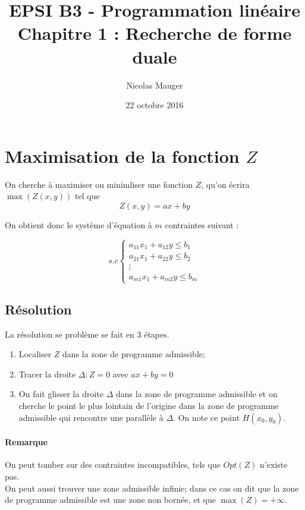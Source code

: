 



\title{EPSI B3 - Programmation linéaire\\Chapitre 1 : Recherche de forme duale}

\author{Nicolas Mauger}

\date{22 octobre 2016}

\maketitle

\section{Maximisation de la fonction $Z$}
On cherche à maximiser ou minimliser une fonction $Z$, qu'on écrira
$\max(Z(x,y))$ tel que $$Z(x,y) = ax + by$$

On obtient donc le système d'équation à $m$ contraintes suivant :

\begin{equation*}
  s.c
     \begin{cases}
        a_{11}x_{1} + a_{12}y \leq b_{1} \\
        a_{21}x_{1} + a_{22}y \leq b_{2} \\
        \vdots                           \\
        a_{m1}x_{1} + a_{m2}y \leq b_{m}
     \end{cases}
\end{equation*}

\subsection{Résolution}
La résolution se problème se fait en 3 étapes.
\begin{enumerate}
  \item Localiser $Z$ dans la zone de programme admissible;
  \item Tracer la droite $ \Delta : Z = 0 $ avec $ax+by=0$
  \item On fait glisser la droite $\Delta$ dans la zone de programme admissible
  et on cherche le point le plus lointain de l'origine dans la zone de programme
  admissible qui rencontre une parallèle à $\Delta$. On note ce point
  $H(x_{0},y_{0})$.
\end{enumerate}

\paragraph{Remarque}
On peut tomber sur des contraintes incompatibles, tels que $Opt(Z)$ n'existe pas. \\
On peut aussi trouver une zone admissible infinie; dans ce cas on dit que la
zone de programme admissible est une zone non bornée, et que $\max(Z)=+\infty$. \\

